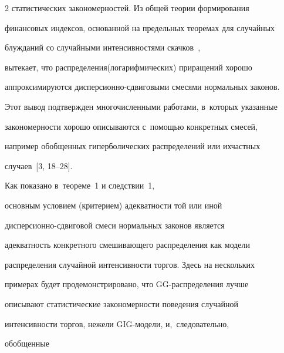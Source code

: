 \begin{multicols}{2}
статистических закономерностей. Из общей теории формирования


финансовых индексов, основанной на предельных теоремах для случайных


блуж\-да\-ний со случайными интенсивностями скачков~\cite{Korolev2011-2},


вытекает, что распределения\linebreak (логариф\-мических) приращений хорошо


аппроксимируются дис\-пер\-си\-он\-но-сдви\-го\-вы\-ми смесями нормальных законов.


Этот вывод подтвержден многочисленными работами, в~которых указанные


закономерности хорошо описываются с~по\-мощью конкретных смесей,


например обобщенных гиперболических распределений или их\linebreak частных


случаев~[3, 18--28]. 


Как показано в~теореме~1 и следствии~1,


основным условием (критерием) адекватности той или иной


дис\-пер\-си\-он\-но-сдви\-го\-вой смеси нормальных законов является


адекватность конкретного смешивающего распределения как модели


распределения случайной интенсивности торгов. Здесь на нескольких


примерах будет продемонстрировано, что GG-рас\-пре\-де\-ле\-ния лучше


описывают статистические закономерности поведения случайной


интенсивности торгов, нежели GIG-мо\-де\-ли, и,~следовательно,


обобщенные\linebreak\vspace*{-12pt}





\pagebreak





\end{multicols}





